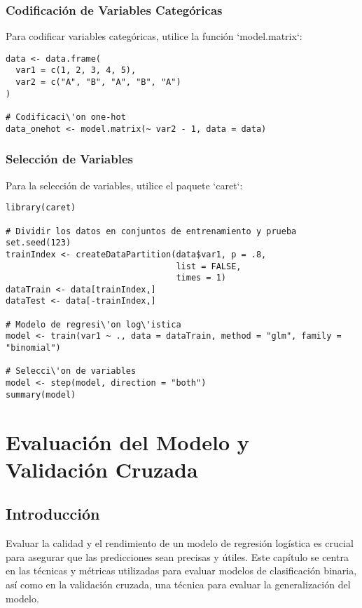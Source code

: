 \documentclass[a4paper]{report} %
\begin{document}
\subsection{Codificaci\'on de Variables Categ\'oricas}

Para codificar variables categ\'oricas, utilice la funci\'on `model.matrix`:
\begin{verbatim}
data <- data.frame(
  var1 = c(1, 2, 3, 4, 5),
  var2 = c("A", "B", "A", "B", "A")
)

# Codificaci\'on one-hot
data_onehot <- model.matrix(~ var2 - 1, data = data)
\end{verbatim}

\subsection{Selecci\'on de Variables}

Para la selecci\'on de variables, utilice el paquete `caret`:
\begin{verbatim}
library(caret)

# Dividir los datos en conjuntos de entrenamiento y prueba
set.seed(123)
trainIndex <- createDataPartition(data$var1, p = .8, 
                                  list = FALSE, 
                                  times = 1)
dataTrain <- data[trainIndex,]
dataTest <- data[-trainIndex,]

# Modelo de regresi\'on log\'istica
model <- train(var1 ~ ., data = dataTrain, method = "glm", family = "binomial")

# Selecci\'on de variables
model <- step(model, direction = "both")
summary(model)
\end{verbatim}



\chapter{Evaluaci\'on del Modelo y Validaci\'on Cruzada}


\section{Introducci\'on}

Evaluar la calidad y el rendimiento de un modelo de regresi\'on log\'istica es crucial para asegurar que las predicciones sean precisas y \'utiles. Este cap\'itulo se centra en las t\'ecnicas y m\'etricas utilizadas para evaluar modelos de clasificaci\'on binaria, as\'i como en la validaci\'on cruzada, una t\'ecnica para evaluar la generalizaci\'on del modelo.
\end{document}
